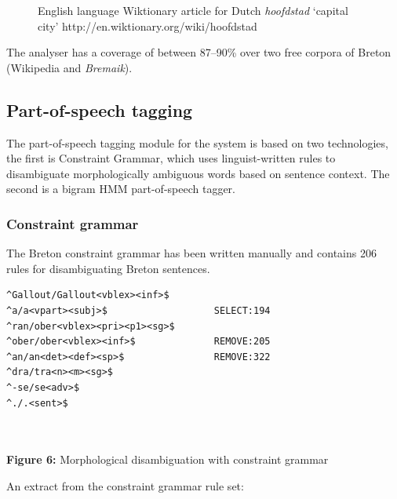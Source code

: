 \documentclass[a0,landscape]{a0poster}
\begin{document}
\begin{multicols}{4}
\begin{figure}
\begin{tiny}
\begin{tabular}{|l|}
\hline
\end{tabular}
\end{tiny}
\caption{English language Wiktionary article for Dutch \emph{hoofdstad} `capital city' 
    {\small http://en.wiktionary.org/wiki/hoofdstad}}
\label{fig:wikt1}
\end{figure}
\vspace{0.5cm}

\noindent
The analyser has a coverage of between 87--90\% over two free corpora of Breton (Wikipedia and \emph{Bremaik}).

\subsection{Part-of-speech tagging}

\noindent
The part-of-speech tagging module for the system is based on two technologies, the first is 
Constraint Grammar, which uses linguist-written rules to disambiguate
morphologically ambiguous words based on sentence context. The second is a
bigram HMM part-of-speech tagger.

\subsubsection{Constraint grammar}

\noindent
The Breton constraint grammar has been written manually and contains 206 rules
for disambiguating Breton sentences. \\

\begin{center}
\begin{minipage}[b]{25cm}
\begin{small}
\begin{verbatim}
^Gallout/Gallout<vblex><inf>$    
^a/a<vpart><subj>$                   SELECT:194
^ran/ober<vblex><pri><p1><sg>$ 
^ober/ober<vblex><inf>$              REMOVE:205
^an/an<det><def><sp>$                REMOVE:322
^dra/tra<n><m><sg>$ 
^-se/se<adv>$
^./.<sent>$
\end{verbatim}
\end{small}
\end{minipage}\\
~\\
\textbf{Figure 6:} Morphological disambiguation with constraint grammar
\vspace{0.5cm}
\end{center}

\noindent
An extract from the constraint grammar rule set:\\


\end{multicols}
\end{document}
